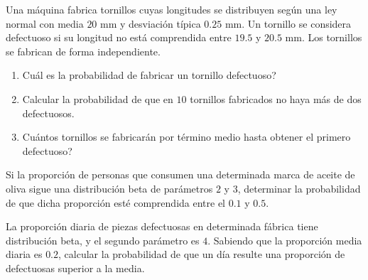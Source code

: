 \begin{ejercicio}
    Una máquina fabrica tornillos cuyas longitudes se distribuyen según una ley normal con media $20$ mm y desviación típica $0.25$ mm. Un tornillo se considera defectuoso si su longitud no está comprendida entre $19.5$ y $20.5$ mm. Los tornillos se fabrican de forma independiente.
    \begin{enumerate}
        \item Cuál es la probabilidad de fabricar un tornillo defectuoso?
        \item Calcular la probabilidad de que en $10$ tornillos fabricados no haya más de dos defectuosos.
        \item Cuántos tornillos se fabricarán por término medio hasta obtener el primero defectuoso?
    \end{enumerate}
\end{ejercicio}

\begin{ejercicio}
    Si la proporción de personas que consumen una determinada marca de aceite de oliva sigue una distribución beta de parámetros $2$ y $3$, determinar la probabilidad de que dicha proporción esté comprendida entre el $0.1$ y $0.5$.
\end{ejercicio}

\begin{ejercicio}
    La proporción diaria de piezas defectuosas en determinada fábrica tiene distribución beta, y el segundo parámetro es $4$. Sabiendo que la proporción media diaria es $0.2$, calcular la probabilidad de que un día resulte una proporción de defectuosas superior a la media.
\end{ejercicio}

